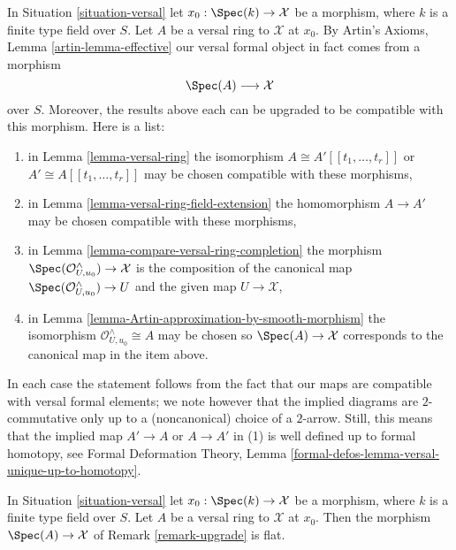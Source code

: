 \begin{remark}
\label{remark-upgrade}
In Situation \ref{situation-versal} let $x_0 : \Spec(k) \to \mathcal{X}$
be a morphism, where $k$ is a finite type field over $S$.
Let $A$ be a versal ring to $\mathcal{X}$ at $x_0$. By Artin's Axioms,
Lemma \ref{artin-lemma-effective} our versal formal object
in fact comes from a morphism
$$
\Spec(A) \longrightarrow \mathcal{X}
$$
over $S$. Moreover, the results above each can be upgraded to be compatible
with this morphism. Here is a list:
\begin{enumerate}
\item in Lemma \ref{lemma-versal-ring} the isomorphism
$A \cong A'[[t_1, \ldots, t_r]]$ or $A' \cong A[[t_1, \ldots, t_r]]$
may be chosen compatible with these morphisms,
\item in Lemma \ref{lemma-versal-ring-field-extension} the
homomorphism $A \to A'$ may be chosen compatible with these morphisms,
\item in Lemma \ref{lemma-compare-versal-ring-completion}
the morphism $\Spec(\mathcal{O}_{U, u_0}^\wedge) \to \mathcal{X}$
is the composition of the canonical map
$\Spec(\mathcal{O}_{U, u_0}^\wedge) \to U$ and the given map
$U \to \mathcal{X}$,
\item in Lemma \ref{lemma-Artin-approximation-by-smooth-morphism}
the isomorphism $\mathcal{O}_{U, u_0}^\wedge \cong A$ may
be chosen so $\Spec(A) \to \mathcal{X}$ corresponds to the canonical map
in the item above.
\end{enumerate}
In each case the statement follows from the fact that our maps are
compatible with versal formal elements; we note however that the
implied diagrams are $2$-commutative only up to a (noncanonical)
choice of a $2$-arrow. Still, this means that the implied map $A' \to A$
or $A \to A'$ in (1) is well defined up to formal homotopy, see
Formal Deformation Theory, Lemma
\ref{formal-defos-lemma-versal-unique-up-to-homotopy}.
\end{remark}

\begin{lemma}
\label{lemma-versal-ring-flat}
In Situation \ref{situation-versal} let $x_0 : \Spec(k) \to \mathcal{X}$
be a morphism, where $k$ is a finite type field over $S$.
Let $A$ be a versal ring to $\mathcal{X}$ at $x_0$.
Then the morphism $\Spec(A) \to \mathcal{X}$ of
Remark \ref{remark-upgrade} is flat.
\end{lemma}

